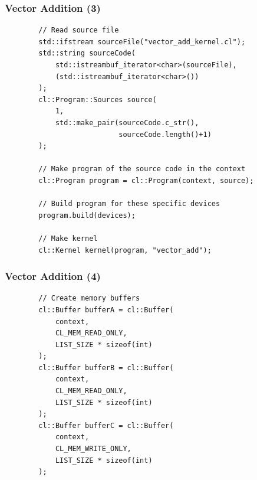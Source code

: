 \begin{frame}[fragile]
  \frametitle{Vector Addition (3)}



  \begin{lstlisting}
        // Read source file
        std::ifstream sourceFile("vector_add_kernel.cl");
        std::string sourceCode(
            std::istreambuf_iterator<char>(sourceFile),
            (std::istreambuf_iterator<char>())
        );
        cl::Program::Sources source(
            1,
            std::make_pair(sourceCode.c_str(),
                           sourceCode.length()+1)
        );
 
        // Make program of the source code in the context
        cl::Program program = cl::Program(context, source);
 
        // Build program for these specific devices
        program.build(devices);
 
        // Make kernel
        cl::Kernel kernel(program, "vector_add");
  \end{lstlisting}

\end{frame}

\begin{frame}[fragile]
  \frametitle{Vector Addition (4)}


  \begin{lstlisting}
        // Create memory buffers
        cl::Buffer bufferA = cl::Buffer(
            context,
            CL_MEM_READ_ONLY,
            LIST_SIZE * sizeof(int)
        );
        cl::Buffer bufferB = cl::Buffer(
            context,
            CL_MEM_READ_ONLY,
            LIST_SIZE * sizeof(int)
        );
        cl::Buffer bufferC = cl::Buffer(
            context,
            CL_MEM_WRITE_ONLY,
            LIST_SIZE * sizeof(int)
        );
  \end{lstlisting}


\end{frame}

